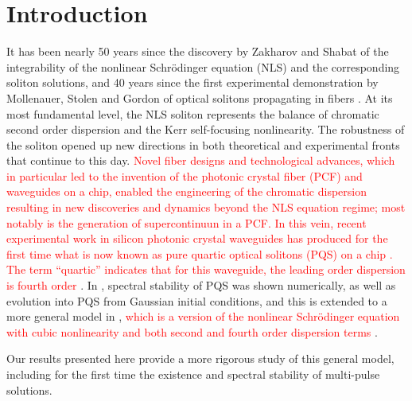 \documentclass[12pt]{elsarticle}
\newcommand{\revised}[1]{ \textcolor{red}{#1} }
\begin{document}
\section{Introduction}
It has been nearly 50 years since the discovery by Zakharov and Shabat \cite{Zak72} of the integrability of the nonlinear Schr\"odinger equation (NLS) and the corresponding soliton solutions, and 40 years since the first experimental demonstration by Mollenauer, Stolen and Gordon of optical solitons propagating in fibers \cite{Moll80}. At its most fundamental level, the NLS soliton represents the balance of chromatic second order dispersion and the Kerr self-focusing nonlinearity. The robustness of the soliton opened up new directions in both theoretical and experimental fronts that continue to this day. \revised{Novel fiber designs and technological advances, which in particular led to the invention of the photonic crystal fiber (PCF) and waveguides on a chip, enabled the engineering of the chromatic dispersion resulting in new discoveries and dynamics beyond the NLS equation regime; most notably is the generation of supercontinuun in a PCF. In this vein, recent experimental work in silicon photonic crystal waveguides has produced for the first time what is now known as pure quartic optical solitons (PQS) on a chip \cite{BlancoPQS}. The term ``quartic'' indicates that for this waveguide, the leading order dispersion is fourth order}. In \cite{Tam2019}, spectral stability of PQS was shown numerically, as well as evolution into PQS from Gaussian initial conditions, and this is extended to a more general model in \cite{Tam2020}, \revised{which is a version of the nonlinear Schr{\"o}dinger equation with cubic nonlinearity and both second and fourth order dispersion terms}.

Our results presented here provide a more rigorous study of this general model, including for the first time the existence and spectral stability of multi-pulse solutions.
\end{document}
